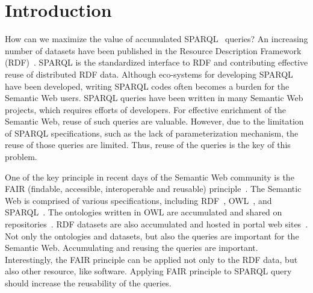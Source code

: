 \documentclass[runningheads]{llncs}
\begin{document}
\section{Introduction}

How can we maximize the value of accumulated SPARQL~\cite{sparql} queries?
An increasing number of datasets have been published in the Resource Description Framework (RDF)~\cite{rdf}.
SPARQL is the standardized interface to RDF and contributing effective reuse of distributed RDF data. 
Although eco-systems for developing SPARQL have been developed, writing SPARQL codes often becomes a burden for the Semantic Web users. 
SPARQL queries have been written in many Semantic Web projects, which requires efforts of developers. 
For effective enrichment of the Semantic Web, reuse of such queries are valuable.
However, due to the limitation of SPARQL specifications, such as the lack of parameterization mechanism, the reuse of those queries are limited. 
Thus, reuse of the queries is the key of this problem.


One of the key principle in recent days of the Semantic Web community is the FAIR (findable, accessible, interoperable and reusable) principle~\cite{fair}.
The Semantic Web is comprised of various specifications, including RDF~\cite{rdf}, OWL~\cite{owl}, and SPARQL~\cite{sparql}. The ontologies written in OWL are accumulated and shared on repositories~\cite{bioportal}.
RDF datasets are also accumulated and hosted in portal web sites~\cite{rdf-portal}.
Not only the ontologies and datasets, but also the queries are important for the Semantic Web.
Accumulating and reusing the queries are important.
Interestingly, the FAIR principle can be applied not only to the RDF data, but also other resource, like software.
Applying FAIR principle to SPARQL query should increase the reusability of the queries.
\end{document}
